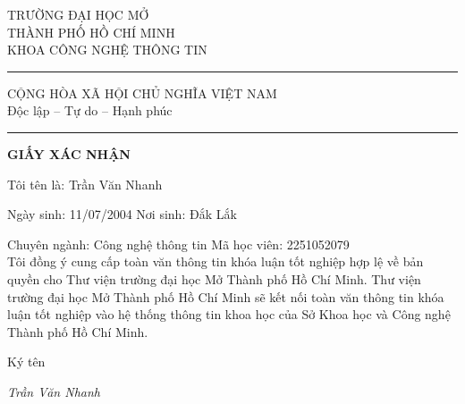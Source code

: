 \clearpage
\thispagestyle{empty}
\noindent
\begin{minipage}[t]{0.40\textwidth}
\centering
TRƯỜNG ĐẠI HỌC MỞ\\
THÀNH PHỐ HỒ CHÍ MINH\\
KHOA CÔNG NGHỆ THÔNG TIN\\
{\centering
\rule{0.7\linewidth}{0.4pt}\par
}
\end{minipage}%
\hfill
\begin{minipage}[t]{0.6\textwidth}
\centering
CỘNG HÒA XÃ HỘI CHỦ NGHĨA VIỆT NAM\\
Độc lập – Tự do – Hạnh phúc \\
{\centering
\rule{0.5\linewidth}{0.4pt}\par
}
\end{minipage}

\vspace{2cm}
\begin{center}
\Large\textbf{GIẤY XÁC NHẬN}
\end{center}

\vspace{1.5cm}
\noindent Tôi tên là: Trần Văn Nhanh

\vspace{0.25cm}

\noindent Ngày sinh: 11/07/2004 \hspace{4cm} Nơi sinh: Đắk Lắk

\vspace{0.25cm}

\noindent Chuyên ngành: Công nghệ thông tin \hspace{2cm} Mã học viên: 2251052079
\vspace{0.75cm}
\\
\noindent Tôi đồng ý cung cấp toàn văn thông tin khóa luận tốt nghiệp hợp lệ về bản quyền cho Thư viện trường đại học Mở Thành phố Hồ Chí Minh. Thư viện trường đại học Mở Thành phố Hồ Chí Minh sẽ kết nối toàn văn thông tin khóa luận tốt nghiệp vào hệ thống thông tin khoa học của Sở Khoa học và Công nghệ Thành phố Hồ Chí Minh.

\vspace{1.5cm}

\begin{flushright}
\begin{minipage}{4cm}
\centering
Ký tên

\vspace{1.5cm}

\textit{Trần Văn Nhanh}
\end{minipage}
\end{flushright}
\clearpage
